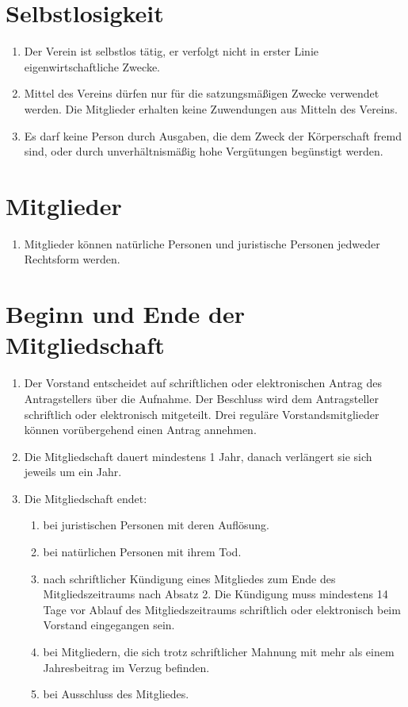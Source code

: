 \documentclass[ngerman]{article}
\begin{document}
\section{Selbstlosigkeit}
\begin{enumerate}
\item Der Verein ist selbstlos tätig, er verfolgt nicht in erster Linie eigenwirtschaftliche Zwecke.
\item Mittel des Vereins dürfen nur für die satzungsmäßigen Zwecke verwendet werden. Die Mitglieder erhalten keine Zuwendungen aus Mitteln des
Vereins.
\item Es darf keine Person durch Ausgaben, die dem Zweck der Körperschaft fremd sind, oder durch unverhältnismäßig hohe Vergütungen begünstigt
werden.
\end{enumerate}

\section{Mitglieder}
\begin{enumerate}
\item Mitglieder können natürliche Personen und juristische Personen jedweder Rechtsform werden.
\end{enumerate}

\section{Beginn und Ende der Mitgliedschaft}
\begin{enumerate}
\item Der Vorstand entscheidet auf schriftlichen oder elektronischen Antrag des Antragstellers über die Aufnahme. Der Beschluss wird dem Antragsteller schriftlich oder elektronisch mitgeteilt. Drei reguläre Vorstandsmitglieder können vorübergehend einen Antrag annehmen.
\item Die Mitgliedschaft dauert mindestens 1 Jahr, danach verlängert sie sich jeweils um ein Jahr.
\item Die Mitgliedschaft endet:

\begin{enumerate}
\item bei juristischen Personen mit deren Auflösung.
\item bei natürlichen Personen mit ihrem Tod.
\item nach schriftlicher Kündigung eines Mitgliedes zum Ende des Mitgliedszeitraums nach Absatz 2. Die Kündigung muss mindestens 14 Tage vor Ablauf des Mitgliedszeitraums schriftlich oder elektronisch beim Vorstand eingegangen sein.
\item bei Mitgliedern, die sich trotz schriftlicher Mahnung mit mehr als einem Jahresbeitrag im Verzug befinden.
\item bei Ausschluss des Mitgliedes.
\end{enumerate}
\end{enumerate}
\end{document}
